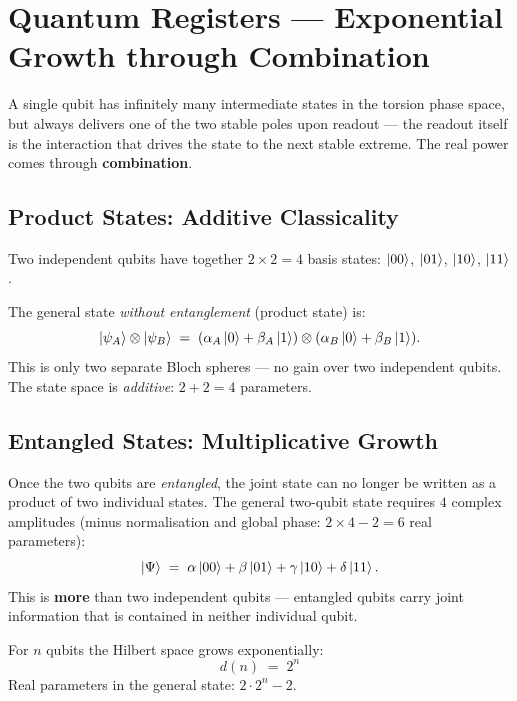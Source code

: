 \section{Quantum Registers --- Exponential Growth through Combination}
\label{sec:register}

A single qubit has infinitely many intermediate states
in the torsion phase space, but always delivers one of
the two stable poles upon readout --- the readout itself
is the interaction that drives the state to the next
stable extreme. The real power comes through \textbf{combination}.

\subsection{Product States: Additive Classicality}

Two independent qubits have together
$2 \times 2 = 4$ basis states:
$\left|00\right\rangle$, $\left|01\right\rangle$, $\left|10\right\rangle$, $\left|11\right\rangle$.

The general state \emph{without entanglement}
(product state) is:
\begin{equation}
  \left|\psi_A\right\rangle \otimes \left|\psi_B\right\rangle
  \;=\; (\alpha_A\left|0\right\rangle + \beta_A\left|1\right\rangle)
         \otimes
         (\alpha_B\left|0\right\rangle + \beta_B\left|1\right\rangle).
\end{equation}
This is only two separate Bloch spheres ---
no gain over two independent qubits.
The state space is \emph{additive}: $2 + 2 = 4$ parameters.

\subsection{Entangled States: Multiplicative Growth}
\label{sec:entanglement}

Once the two qubits are \emph{entangled},
the joint state can no longer be written as a product
of two individual states.
The general two-qubit state requires
$4$ complex amplitudes (minus normalisation and
global phase: $2 \times 4 - 2 = 6$ real parameters):
\begin{equation}
  \left|\Psi\right\rangle \;=\; \alpha\left|00\right\rangle + \beta\left|01\right\rangle
              + \gamma\left|10\right\rangle + \delta\left|11\right\rangle.
\end{equation}
This is \textbf{more} than two independent qubits ---
entangled qubits carry joint information
that is contained in neither individual qubit.

For $n$ qubits the Hilbert space grows exponentially:
\begin{equation}
  \boxed{d(n) \;=\; 2^n}
\end{equation}
Real parameters in the general state: $2 \cdot 2^n - 2$.

